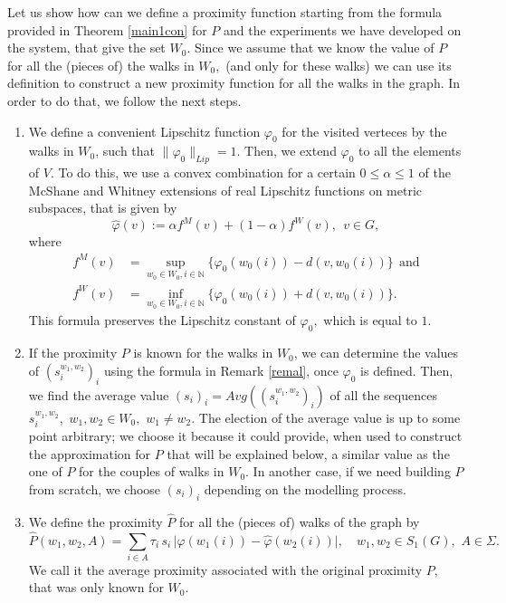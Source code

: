 \documentclass[preprint,12pt]{elsarticle}
\begin{document}
Let us show how can we define a proximity function starting from the formula provided in Theorem \ref{main1con} for $P$ and the experiments we have developed on the system, that give the set $W_0.$ Since we assume that we know the value of $P$ for all the (pieces of) the walks in $W_0,$ (and only for these walks) we can use its definition to construct a new proximity function for all the walks in the graph. In order to do that, we follow the next steps.

\begin{enumerate}
    \item We define a convenient Lipschitz function $\varphi_0$ for the visited verteces by the walks in $W_0$, such that $\|\varphi_0\|_{Lip}=1$. Then, we extend $\varphi_0$ to all the elements of $V$. To do this, we use a convex combination for a certain $0 \le \alpha \le 1$ of the McShane and Whitney extensions of real Lipschitz functions on metric subspaces, that is given by   
\begin{equation}\label{formula_ext}
    \widehat \varphi(v):= \alpha f^M(v) + (1-\alpha) f^W(v), \ \ v \in G,
\end{equation}
where
\begin{align*}
    f^M(v) &= \sup_{w_0\in W_0, i \in \mathbb N}\{\varphi_0(w_0(i))-  d(v,w_0(i))\} \ \ \text{and} \\
    f^W(v) &= \inf_{w_0\in W_0, i \in \mathbb N}\{\varphi_0(w_0(i))+  d(v,w_0(i))\}.
\end{align*}
This formula preserves the Lipschitz constant of $\varphi_0,$ which is equal to $1.$

\item If the proximity $P$ is known for the walks in $W_0$, we can determine the values of $(s_i^{w_1,w_2})_i$ using the formula in Remark \ref{remal}, once $\varphi_0$ is defined. Then, we find the average value $(s_i)_i=Avg((s^{w_1,w_2}_i)_i)$ of all the sequences $s^{w_1,w_2}_i,$ $w_1,w_2 \in W_0,$ $w_1 \ne w_2$. The election of the average value is up to some point arbitrary; we choose it because it could provide, when used to construct the approximation for $P$ that will be explained below, a similar value as the one of $P$ for the couples of walks in $W_0$. In another case, if we need building $P$ from scratch, we choose $(s_i)_i$ depending on the modelling process.

\item We define the proximity $\widehat P$
for all the (pieces of) walks of the graph by
$$
\widehat P(w_1,w_2,A) = \sum_{i \in A} \tau_i \, s_i \, \big| \widehat \varphi(w_1(i))-  \widehat \varphi(w_2(i)) \big|, \quad w_1,w_2 \in S_1(G), \,\, A \in \Sigma.
$$
We call it the average proximity associated with the original proximity $P,$ that was only known for $W_0.$
\end{enumerate}
\end{document}
